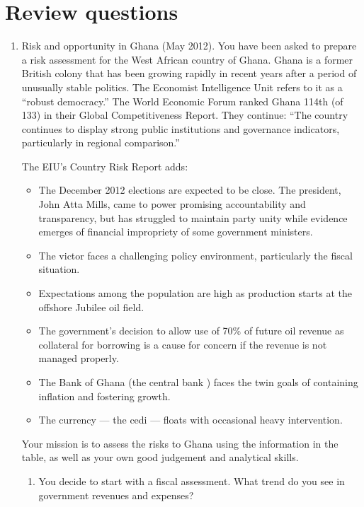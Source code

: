 %

\section*{Review questions}

\setlength{\leftmargini}{.5\oldleftmargini}
\begin{enumerate}
\item Risk and opportunity in Ghana (May 2012).
You have been asked to prepare a risk assessment for
the West African country of Ghana.
Ghana is a former British colony that has been growing rapidly
in recent years after a period of unusually stable politics.
The Economist Intelligence Unit refers to it as a ``robust democracy.''
The World Economic Forum ranked Ghana 114th (of 133)
in their Global Competitiveness Report.
They continue:
``The country continues to display strong public institutions and
governance indicators,
particularly in regional comparison.''

The EIU's Country Risk Report adds:
\begin{itemize}
\item The December 2012 elections are expected to be close.
The president, John Atta Mills, came to power promising accountability
and transparency, but  has struggled to maintain party unity
while evidence emerges of financial impropriety of some government ministers.
\item The victor faces a challenging policy environment, particularly
the fiscal situation.
\item Expectations among the population are high as production
starts at the offshore Jubilee oil field.
\item The government's decision to allow use of 70\% of future
oil revenue as collateral for borrowing is a cause for concern
if the revenue is not managed properly.
\item The Bank of Ghana (the central bank ) faces the twin goals of
containing inflation and fostering growth.
\item The currency  ---  the cedi --- floats with occasional heavy intervention.
\end{itemize}
%
Your mission is to assess the risks to Ghana  using
the information in the table, as well as
your own good judgement and analytical skills.

\begin{enumerate}
\item  You decide to start with a fiscal assessment.
What trend do you see in government revenues and expenses?


\end{enumerate}
\end{enumerate}
